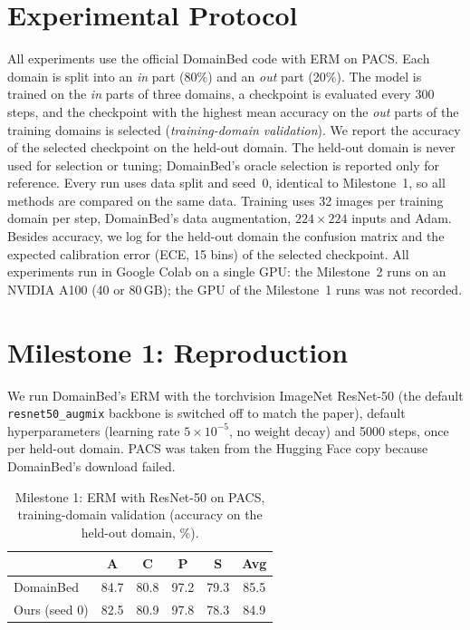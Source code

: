 \documentclass[conference]{IEEEtran}
\begin{document}
\section{Experimental Protocol}\label{sec:protocol}
All experiments use the official DomainBed code with ERM on PACS. Each domain is split into an \emph{in} part (80\%) and an \emph{out} part (20\%). The model is trained on the \emph{in} parts of three domains, a checkpoint is evaluated every 300 steps, and the checkpoint with the highest mean accuracy on the \emph{out} parts of the training domains is selected (\emph{training-domain validation}). We report the accuracy of the selected checkpoint on the held-out domain. The held-out domain is never used for selection or tuning; DomainBed's oracle selection is reported only for reference. Every run uses data split and seed~0, identical to Milestone~1, so all methods are compared on the same data. Training uses 32 images per training domain per step, DomainBed's data augmentation, $224\times224$ inputs and Adam. Besides accuracy, we log for the held-out domain the confusion matrix and the expected calibration error (ECE, 15 bins) of the selected checkpoint. All experiments run in Google Colab on a single GPU: the Milestone~2 runs on an NVIDIA A100 (40 or 80\,GB); the GPU of the Milestone~1 runs was not recorded.

\section{Milestone 1: Reproduction}\label{sec:m1}
We run DomainBed's ERM with the torchvision ImageNet ResNet-50 (the default \texttt{resnet50\_augmix} backbone is switched off to match the paper), default hyperparameters (learning rate $5\times10^{-5}$, no weight decay) and 5000 steps, once per held-out domain. PACS was taken from the Hugging Face copy because DomainBed's download failed.

\begin{table}[t]
\centering
\caption{Milestone 1: ERM with ResNet-50 on PACS, training-domain validation (accuracy on the held-out domain, \%).}
\label{tab:m1}
\begin{tabular}{lccccc}
\toprule
 & A & C & P & S & Avg\\
\midrule
DomainBed~\cite{gulrajani2021domainbed} & 84.7 & 80.8 & 97.2 & 79.3 & 85.5\\
Ours (seed 0) & 82.5 & 80.9 & 97.8 & 78.3 & 84.9\\
\bottomrule
\end{tabular}
\end{table}
\end{document}
